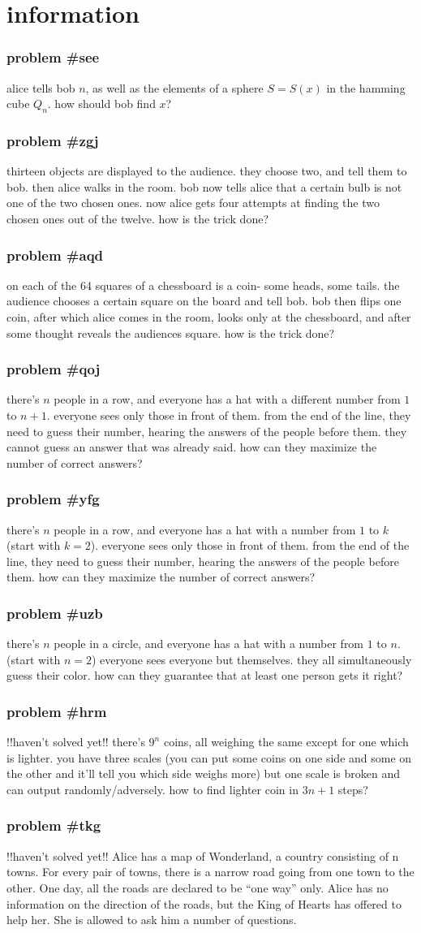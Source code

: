 \documentclass{article}
\newcommand{\problem}[1]{\subsubsection*{\textbf{problem \##1}}}
\newcommand{\chapter}[1]{\section*{#1}}
\begin{document}
\chapter{information}
\problem{see} alice tells bob $n$, as well as the elements of a sphere $S=S(x)$ in the hamming cube $Q_n$. how should bob find $x$?
\problem{zgj} thirteen objects are displayed to the audience. they choose two, and tell them to bob. then alice walks in the room. bob now tells alice that a certain bulb is not one of the two chosen ones. now alice gets four attempts at finding the two chosen ones out of the twelve. how is the trick done?
\problem{aqd} on each of the 64 squares of a chessboard is a coin- some heads, some tails. the audience chooses a certain square on the board and tell bob. bob then flips one coin, after which alice comes in the room, looks only at the chessboard, and after some thought reveals the audiences square. how is the trick done?
\problem{qoj} there's $n$ people in a row, and everyone has a hat with a different number from $1$ to $n+1$. everyone sees only those in front of them. from the end of the line, they need to guess their number, hearing the answers of the people before them. they cannot guess an answer that was already said. how can they maximize the number of correct answers?
\problem{yfg} there's $n$ people in a row, and everyone has a hat with a number from $1$ to $k$ (start with $k=2$). everyone sees only those in front of them. from the end of the line, they need to guess their number, hearing the answers of the people before them. how can they maximize the number of correct answers?
\problem{uzb} there's $n$ people in a circle, and everyone has a hat with a number from $1$ to $n$. (start with $n=2$) everyone sees everyone but themselves. they all simultaneously guess their color. how can they guarantee that at least one person gets it right?
\problem{hrm} !!haven't solved yet!! there's $9^n$ coins, all weighing the same except for one which is lighter. you have three scales (you can put some coins on one side and some on the other and it'll tell you which side weighs more) but one scale is broken and can output randomly/adversely. how to find lighter coin in $3n+1$ steps?
\problem{tkg} !!haven't solved yet!! Alice has a map of Wonderland, a country consisting of n towns. For every
pair of towns, there is a narrow road going from one town to the other. One day, all the roads
are declared to be “one way” only. Alice has no information on the direction of the roads, but
the King of Hearts has offered to help her. She is allowed to ask him a number of questions.
\end{document}
